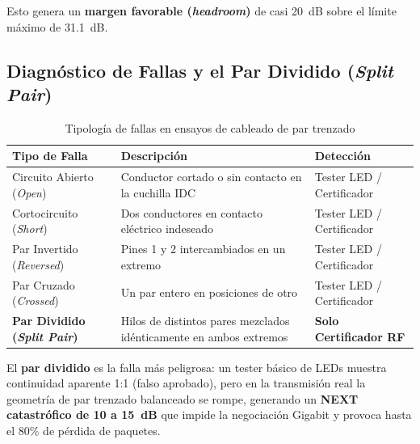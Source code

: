 Esto genera un \textbf{margen favorable (\textit{headroom})} de casi 20~dB sobre el límite máximo de 31.1~dB.

\subsection{Diagnóstico de Fallas y el Par Dividido (\textit{Split Pair})}

\begin{table}[H]
\centering
\caption{Tipología de fallas en ensayos de cableado de par trenzado}
\begin{tabularx}{\textwidth}{@{}lXl@{}}
\toprule
\textbf{Tipo de Falla} & \textbf{Descripción} & \textbf{Detección} \\
\midrule
Circuito Abierto (\textit{Open})    & Conductor cortado o sin contacto en la cuchilla IDC            & Tester LED / Certificador \\
Cortocircuito (\textit{Short})      & Dos conductores en contacto eléctrico indeseado                & Tester LED / Certificador \\
Par Invertido (\textit{Reversed})   & Pines 1 y 2 intercambiados en un extremo                       & Tester LED / Certificador \\
Par Cruzado (\textit{Crossed})      & Un par entero en posiciones de otro                             & Tester LED / Certificador \\
\textbf{Par Dividido (\textit{Split Pair})} & Hilos de distintos pares mezclados idénticamente en ambos extremos & \textbf{Solo Certificador RF} \\
\bottomrule
\end{tabularx}
\label{tab:fallas}
\end{table}

El \textbf{par dividido} es la falla más peligrosa: un tester básico de LEDs muestra continuidad aparente 1:1 (falso aprobado), pero en la transmisión real la geometría de par trenzado balanceado se rompe, generando un \textbf{NEXT catastrófico de 10 a 15~dB} que impide la negociación Gigabit y provoca hasta el 80\% de pérdida de paquetes.


